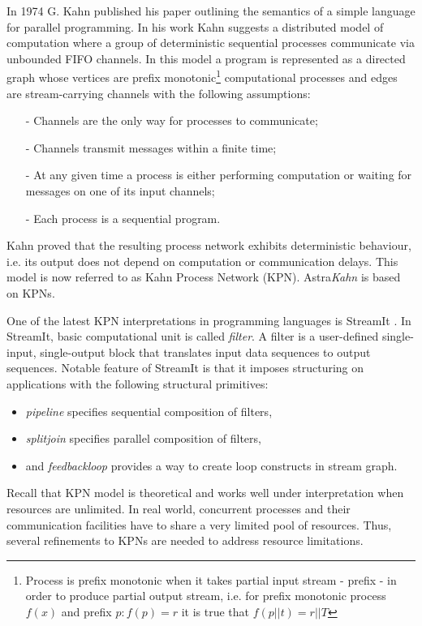 \documentclass{article}
\begin{document}
In 1974 G. Kahn published his paper \cite{kahn74} outlining the semantics of a simple language for parallel programming. In his work Kahn suggests a distributed model of computation where a group of deterministic sequential processes communicate via unbounded FIFO channels. In this model a program is represented as a directed graph whose vertices are prefix monotonic\footnote{Process is prefix monotonic when it takes partial input stream - prefix - in order to produce partial output stream, i.e. for prefix monotonic process $f(x)$ and prefix $p : f(p)=r$ it is true that $f(p || t) = r || T$} computational processes and edges are stream-carrying channels with the following assumptions:
\begin{itemize}
\item[-]Channels are the only way for processes to communicate;
\item[-]Channels transmit messages within a finite time;
\item[-]At any given time a process is either performing computation or waiting for messages on one of its input channels;
\item[-]Each process is a sequential program.
\end{itemize}
Kahn proved that the resulting process network exhibits deterministic behaviour, i.e. its output does not depend on computation or communication delays. This model is now referred to as Kahn Process Network (KPN). Astra\emph{Kahn} is based on KPNs.

One of the latest KPN interpretations in programming languages is StreamIt \cite{streamit}. In StreamIt, basic computational unit is called \emph{filter}. A filter is a user-defined single-input, single-output block that translates input data sequences to output sequences. Notable feature of StreamIt is that it imposes structuring on applications with the following structural primitives:
\begin{itemize}
\item \emph{pipeline} specifies sequential composition of filters,
\item \emph{splitjoin} specifies parallel composition of filters,
\item and \emph{feedbackloop} provides a way to create loop constructs in stream graph.
\end{itemize}

Recall that KPN model is theoretical and works well under interpretation when resources are unlimited. In real world, concurrent processes and their communication facilities have to share a very limited pool of resources. Thus, several refinements to KPNs are needed to address resource limitations.
\end{document}
